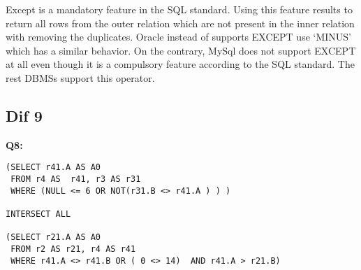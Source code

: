 Except is a mandatory feature in the  SQL standard. Using this feature results to return all rows from the outer relation which are not present in the inner relation with removing the duplicates.  Oracle instead of supports EXCEPT use ‘MINUS’ which has a similar behavior. On the contrary, MySql does not support EXCEPT at all even though it is a compulsory feature according to the SQL standard. The rest DBMSs support this operator. 

\subsection{Dif 9}
  
\begin{mdframed}[backgroundcolor=lightgray!20] 
\textbf{Q8:}
\begin{lstlisting}
(SELECT r41.A AS A0
 FROM r4 AS  r41, r3 AS r31
 WHERE (NULL <= 6 OR NOT(r31.B <> r41.A ) ) )
 
INTERSECT ALL

(SELECT r21.A AS A0
 FROM r2 AS r21, r4 AS r41
 WHERE r41.A <> r41.B OR ( 0 <> 14)  AND r41.A > r21.B)
\end{lstlisting}
\end{mdframed}

